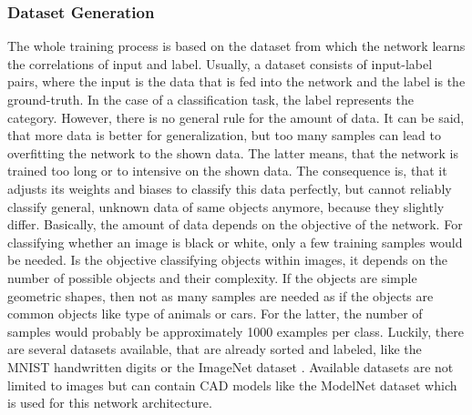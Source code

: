 \subsubsection{Dataset Generation}
\label{sec:dataset-generation}
The whole training process is based on the dataset from which the network learns the correlations of input and label.
Usually, a dataset consists of input-label pairs, where the input is the data that is fed into the network and the label is the ground-truth.
In the case of a classification task, the label represents the category.
However, there is no general rule for the amount of data.
It can be said, that more data is better for generalization, but too many samples can lead to overfitting the network to the shown data.
The latter means, that the network is trained too long or to intensive on the shown data.
The consequence is, that it adjusts its weights and biases to classify this data perfectly, but cannot reliably classify general, unknown data of same objects anymore, because they slightly differ.
Basically, the amount of data depends on the objective of the network.
For classifying whether an image is black or white, only a few training samples would be needed.
Is the objective classifying objects within images, it depends on the number of possible objects and their complexity.
If the objects are simple geometric shapes, then not as many samples are needed as if the objects are common objects like type of animals or cars.
For the latter, the number of samples would probably be approximately 1000 examples per class.
Luckily, there are several datasets available, that are already sorted and labeled, like the MNIST handwritten digits or the ImageNet dataset \cite{Russakovsky:2015:ILS:2846547.2846559}.
Available datasets are not limited to images but can contain CAD models like the ModelNet dataset \cite{conf/cvpr/WuSKYZTX15} which is used for this network architecture.


